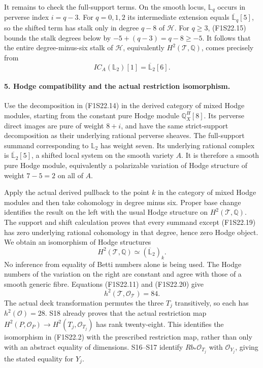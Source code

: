 It remains to check the full-support terms. On the smooth
locus, $\mathbb L_q$ occurs in perverse index $i=q-3$.
For $q=0,1,2$ its intermediate extension equals
$\overline{\mathbb L}_q[5]$, so the shifted term has
stalk only in degree $q-8$ of $\mathcal H$.
For $q\ge3$, (F1S22.15) bounds the stalk degrees below
by $-5+(q-3)=q-8\ge-5$.
It follows that the entire degree-minus-six stalk of
$\mathcal H$, equivalently $H^2(\mathcal T,\mathbb Q)$,
comes precisely from
\[
       IC_A(\mathbb L_2)[1]
                 =\overline{\mathbb L}_2[6].
 \tag{F1S22.19}
\]

\paragraph{5. Hodge compatibility and the actual restriction isomorphism.}
Use the decomposition in (F1S22.14) in the derived
category of mixed Hodge modules, starting from the
constant pure Hodge module $\mathbb Q_X^H[8]$.
Its perverse direct images are pure of weight $8+i$,
and have the same strict-support decomposition as their
underlying rational perverse sheaves. The full-support
summand corresponding to $\mathbb L_2$ has weight seven.
Its underlying rational complex is
$\overline{\mathbb L}_2[5]$, a shifted local system on
the smooth variety $A$. It is therefore a smooth pure
Hodge module, equivalently a polarizable variation of
Hodge structure of weight $7-5=2$ on all of $A$.

Apply the actual derived pullback to the point $k$ in
the category of mixed Hodge modules and then take
cohomology in degree minus six. Proper base change
identifies the result on the left with the usual Hodge
structure on $H^2(\mathcal T,\mathbb Q)$.
The support and shift calculation proves that every
summand except (F1S22.19) has zero underlying rational
cohomology in that degree, hence zero Hodge object.
We obtain an isomorphism of Hodge structures
\[
 H^2(\mathcal T,\mathbb Q)
          \simeq (\overline{\mathbb L}_2)_k.
 \tag{F1S22.20}
\]
No inference from equality of Betti numbers alone is
being used. The Hodge numbers of the variation on the
right are constant and agree with those of a smooth
generic fibre. Equations (F1S22.11) and (F1S22.20) give
\[
                   h^2(\mathcal T,\mathcal O_{\mathcal T})=84.
 \tag{F1S22.21}
\]
The actual deck transformation permutes the three $T_j$
transitively, so each has $h^2(\mathcal O)=28$.
S18 already proves that the actual restriction map
$H^2(P,\mathcal O_P)\to H^2(T_j,\mathcal O_{T_j})$
has rank twenty-eight. This identifies the isomorphism
in (F1S22.2) with the prescribed restriction map, rather
than only with an abstract equality of dimensions.
S16--S17 identify $Rb_*\mathcal O_{T_j}$ with
$\mathcal O_{Y_j}$, giving the stated equality for $Y_j$.

